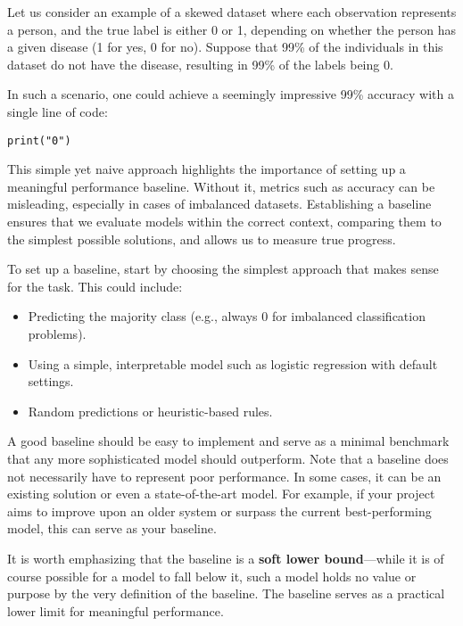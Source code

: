 \documentclass[12pt,openany]{book}
\begin{document}
Let us consider an example of a skewed dataset where each observation represents a person, and the true label is either 0 or 1, depending on whether the person has a given disease (1 for yes, 0 for no). Suppose that 99\% of the individuals in this dataset do not have the disease, resulting in 99\% of the labels being 0.

In such a scenario, one could achieve a seemingly impressive 99\% accuracy with a single line of code:

\begin{verbatim}
print("0")
\end{verbatim}

This simple yet naive approach highlights the importance of setting up a meaningful performance baseline. Without it, metrics such as accuracy can be misleading, especially in cases of imbalanced datasets. Establishing a baseline ensures that we evaluate models within the correct context, comparing them to the simplest possible solutions, and allows us to measure true progress. \newline

To set up a baseline, start by choosing the simplest approach that makes sense for the task. This could include:
\begin{itemize}
    \item Predicting the majority class (e.g., always 0 for imbalanced classification problems).
    \item Using a simple, interpretable model such as logistic regression with default settings.
    \item Random predictions or heuristic-based rules.
\end{itemize}

A good baseline should be easy to implement and serve as a minimal benchmark that 
any more sophisticated model should outperform. Note that a baseline does not 
necessarily have to represent poor performance. In some cases, it can be an existing 
solution or even a state-of-the-art model. For example, if your project aims to 
improve upon an older system or surpass the current best-performing model, this 
can serve as your baseline. \newline

It is worth emphasizing that the baseline is a \textbf{soft lower bound}---while it 
is of course possible for a model to fall below it, such a model holds no value or purpose by the very definition of the baseline. The baseline serves as a practical lower limit for meaningful performance.  \newline
\end{document}
